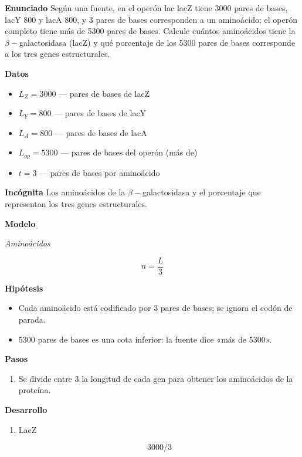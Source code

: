 \documentclass{book}
\begin{document}
\begin{tcolorbox}[title={Problema resuelto}, studiumworked, breakable]

\noindent\textbf{Enunciado}
Según una fuente, en el operón lac lacZ tiene 3000 pares de bases, lacY 800 y lacA 800, y 3 pares de bases corresponden a un aminoácido; el operón completo tiene más de 5300 pares de bases. Calcule cuántos aminoácidos tiene la \(\beta-\)galactosidasa (lacZ) y qué porcentaje de los 5300 pares de bases corresponde a los tres genes estructurales.


\noindent\textbf{Datos}
\begin{itemize}
\item $L_{Z} = 3000$ — pares de bases de lacZ
\item $L_{Y} = 800$ — pares de bases de lacY
\item $L_{A} = 800$ — pares de bases de lacA
\item $L_{op} = 5300$ — pares de bases del operón (más de)
\item $t = 3$ — pares de bases por aminoácido
\end{itemize}

\noindent\textbf{Incógnita}
Los aminoácidos de la \(\beta-\)galactosidasa y el porcentaje que representan los tres genes estructurales.


\noindent\textbf{Modelo}

\noindent\textit{Aminoácidos}

\[
n = \frac{L}{3}
\]

\noindent\textbf{Hipótesis}
\begin{itemize}
\item Cada aminoácido está codificado por 3 pares de bases; se ignora el codón de parada.
\item 5300 pares de bases es una cota inferior: la fuente dice «más de 5300».
\end{itemize}

\noindent\textbf{Pasos}
\begin{enumerate}
\item
Se divide entre 3 la longitud de cada gen para obtener los aminoácidos de la proteína.

\end{enumerate}

\noindent\textbf{Desarrollo}
\begin{enumerate}
\item
LacZ


\[
3000/3
\]


\end{enumerate}
\end{tcolorbox}
\end{document}
